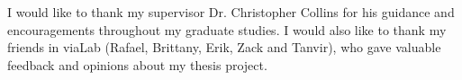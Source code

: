 \begin{preliminary}

\begin{acknowledgements}
I would like to thank my supervisor Dr. Christopher Collins for his guidance and
encouragements throughout my graduate studies. I would also like to thank my
friends in viaLab (Rafael, Brittany, Erik, Zack and Tanvir), who gave valuable
feedback and opinions about my thesis project.



\end{acknowledgements}

\tableofcontents

\listoffigures
\listoftables



\end{preliminary}






 

 




